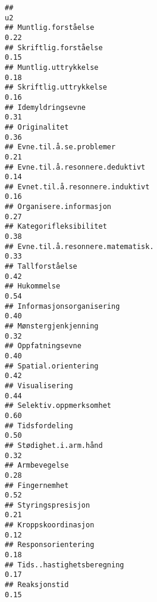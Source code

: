 \documentclass[
]{article}
\begin{document}
\begin{verbatim}
##                                                                                    u2
## Muntlig.forståelse                                                               0.22
## Skriftlig.forståelse                                                             0.15
## Muntlig.uttrykkelse                                                              0.18
## Skriftlig.uttrykkelse                                                            0.16
## Idemyldringsevne                                                                 0.31
## Originalitet                                                                     0.36
## Evne.til.å.se.problemer                                                          0.21
## Evne.til.å.resonnere.deduktivt                                                   0.14
## Evnet.til.å.resonnere.induktivt                                                  0.16
## Organisere.informasjon                                                           0.27
## Kategorifleksibilitet                                                            0.38
## Evne.til.å.resonnere.matematisk.                                                 0.33
## Tallforståelse                                                                   0.42
## Hukommelse                                                                       0.54
## Informasjonsorganisering                                                         0.40
## Mønstergjenkjenning                                                              0.32
## Oppfatningsevne                                                                  0.40
## Spatial.orientering                                                              0.42
## Visualisering                                                                    0.44
## Selektiv.oppmerksomhet                                                           0.60
## Tidsfordeling                                                                    0.50
## Stødighet.i.arm.hånd                                                             0.32
## Armbevegelse                                                                     0.28
## Fingernemhet                                                                     0.52
## Styringspresisjon                                                                0.21
## Kroppskoordinasjon                                                               0.12
## Responsorientering                                                               0.18
## Tids..hastighetsberegning                                                        0.17
## Reaksjonstid                                                                     0.15

\end{verbatim}
\end{document}
